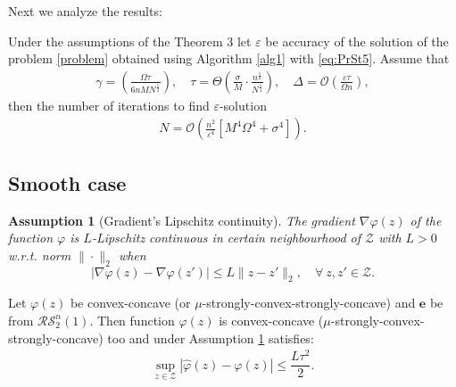 \documentclass[runningheads]{llncs}
\newtheorem{assumption}{Assumption}
\begin{document}
Next we analyze the results:
\begin{corollary} Under the assumptions of the Theorem 3 let $\varepsilon$ be accuracy of the solution of the problem \eqref{problem} obtained using Algorithm \ref{alg1} with \eqref{eq:PrSt5}. Assume that
\begin{eqnarray*}
    \gamma = \left(\frac{\Omega \tau}{6n M N^{\frac{1}{2}}}\right), \quad \tau = \Theta \left( \frac{\sigma}{M}\cdot \frac{n^{\frac{1}{2}} }{N^{\frac{1}{4}}}\right),\quad \Delta = \mathcal{O} \left(\frac{\varepsilon \tau}{ \Omega n}\right),
\end{eqnarray*}
then the number of iterations to find $\varepsilon$-solution
\begin{eqnarray*}
    N = \mathcal{O} \left( \frac{n^2}{\varepsilon^4} \left[M^4 \Omega^4  +   \sigma^4\right]\right).
\end{eqnarray*}
\end{corollary}



\subsection{Smooth case}\label{32}

\begin{assumption}[Gradient's Lipschitz continuity]\label{grad_lip}
The gradient $\nabla \varphi(z)$ of the function $\varphi$ is $L$-Lipschitz continuous in certain neighbourhood of $\mathcal{Z}$ with $L > 0$ w.r.t. norm $\|\cdot\|_2$ when 
\begin{equation*}
| \nabla \varphi(z)- \nabla \varphi(z')|\leq L\|z-z'\|_2, \quad \forall\ z, z'\in \mathcal{Z}.
\end{equation*}
\end{assumption}

\begin{lemma}\label{lemma_ltau^2}
    Let ${\varphi}(z)$ be convex-concave (or $\mu$-strongly-convex-strongly-concave) and $\mathbf{e}$ be from $\mathcal{RS}^n_2(1)$. Then function $\hat{\varphi}(z)$ is convex-concave ($\mu$-strongly-convex-strongly-concave) too  and under Assumption \ref{grad_lip} satisfies:
    \begin{eqnarray}
        \label{Ltau^2}
        \sup_{z \in \mathcal{Z}} |\hat{\varphi}(z) - {\varphi}(z)| \leq \dfrac{L\tau^2}{2}. 
    \end{eqnarray}
\end{lemma}
\end{document}
